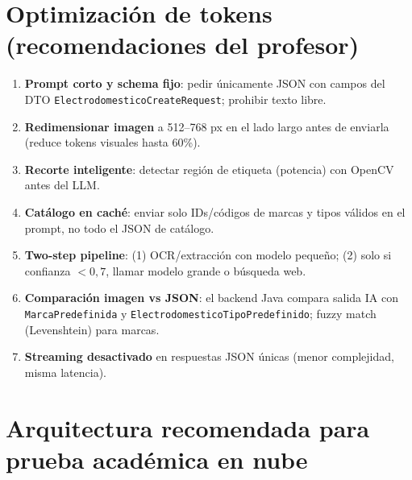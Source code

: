 \documentclass[11pt,a4paper]{article}
\begin{document}
\section{Optimización de tokens (recomendaciones del profesor)}

\begin{enumerate}[leftmargin=*]
  \item \textbf{Prompt corto y schema fijo}: pedir únicamente JSON con campos del DTO \texttt{ElectrodomesticoCreateRequest}; prohibir texto libre.
  \item \textbf{Redimensionar imagen} a 512--768 px en el lado largo antes de enviarla (reduce tokens visuales hasta 60\%).
  \item \textbf{Recorte inteligente}: detectar región de etiqueta (potencia) con OpenCV antes del LLM.
  \item \textbf{Catálogo en caché}: enviar solo IDs/códigos de marcas y tipos válidos en el prompt, no todo el JSON de catálogo.
  \item \textbf{Two-step pipeline}: (1) OCR/extracción con modelo pequeño; (2) solo si confianza $< 0{,}7$, llamar modelo grande o búsqueda web.
  \item \textbf{Comparación imagen vs JSON}: el backend Java compara salida IA con \texttt{MarcaPredefinida} y \texttt{ElectrodomesticoTipoPredefinido}; fuzzy match (Levenshtein) para marcas.
  \item \textbf{Streaming desactivado} en respuestas JSON únicas (menor complejidad, misma latencia).
\end{enumerate}

\section{Arquitectura recomendada para prueba académica en nube}
\end{document}
